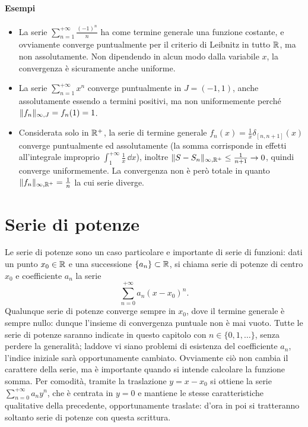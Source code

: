 \paragraph{Esempi}
\begin{itemize}
\item La serie $\sum_{n=1}^{+\infty}\frac{(-1)^n}{n}$ ha come termine generale una funzione costante, e ovviamente converge puntualmente per il criterio di Leibnitz in tutto $\mathbb{R}$, ma non assolutamente. Non dipendendo in alcun modo dalla variabile $x$, la convergenza è sicuramente anche uniforme.
\item La serie $\sum_{n=1}^{+\infty}x^n$ converge puntualmente in $J=(-1,1)$, anche assolutamente essendo a termini positivi, ma non uniformemente perché $\lVert f_n\rVert_{\infty,J}=f_n(1)=1$.
\item Considerata solo in $\mathbb{R}^+$, la serie di termine generale $f_n(x)=\frac1{x}\delta_{[n,n+1]}\scriptstyle(x)$ converge puntualmente ed assolutamente (la somma corrisponde in effetti all'integrale improprio $\int_1^{+\infty}\frac1{x}\,\scriptstyle\dd x$), inoltre $\lVert S-S_n\rVert_{\infty,\mathbb{R}^+}\leq\frac1{n+1}\to 0$, quindi converge uniformemente. La convergenza non è però totale in quanto $\lVert f_n\rVert_{\infty,\mathbb{R}^+}=\frac1{n}$ la cui serie diverge.
\end{itemize}

\section{Serie di potenze}
Le serie di potenze sono un caso particolare e importante di serie di funzioni: dati un punto $x_0\in\mathbb{R}$ e una successione $\{a_n\}\subset\mathbb{R}$, si chiama serie di potenze di centro $x_0$ e coefficiente $a_n$ la serie
\[
\sum_{n=0}^{+\infty}a_n(x-x_0)^n.
\]
Qualunque serie di potenze converge sempre in $x_0$, dove il termine generale è sempre nullo: dunque l'insieme di convergenza puntuale non è mai vuoto.
Tutte le serie di potenze saranno indicate in questo capitolo con $n\in\{0,1,\dots\}$, senza perdere la generalità; laddove vi siano problemi di esistenza del coefficiente $a_n$, l'indice iniziale sarà opportunamente cambiato. Ovviamente ciò non cambia il carattere della serie, ma è importante quando si intende calcolare la funzione somma.
Per comodità, tramite la traslazione $y=x-x_0$ si ottiene la serie $\sum_{n=0}^{+\infty}a_ny^n$, che è centrata in $y=0$ e mantiene le stesse caratteristiche qualitative della precedente, opportunamente traslate: d'ora in poi si tratteranno soltanto serie di potenze con questa scrittura.
